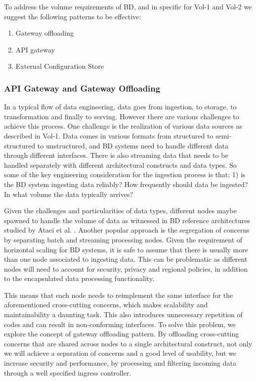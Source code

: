\documentclass{bmcart}
\begin{document}
To address the volume requirements of BD, and in specific for Vol-1 and Vol-2 we suggest the following patterns to be effective:

\begin{enumerate}
  \item Gateway offloading
  \item API gateway
  \item External Configuration Store
\end{enumerate}

\subsubsection{API Gateway and Gateway Offloading}

In a typical flow of data engineering, data goes from ingestion, to storage, to transformation and finally to serving. However there are various challenges to achieve this process. One challenge is the realization of various data sources as described in Vol-1. Data comes in various formats from structured to semi-structured to unstructured, and BD systems need to handle different data through different interfaces. There is also streaming data that needs to be handled separately with different architectural constructs and data types. So some of the key engineering consideration for the ingestion process is that; 1) is the BD system ingesting data reliably? How frequently should data be ingested? In what volume the data typically arrives?

Given the challenges and particularities of data types, different nodes maybe spawned to handle the volume of data as witnessed in BD reference architectures studied by Ataei et al. \cite{ataei2020big}. Another popular approach is the segregation of concerns by separating batch and streaming processing nodes. Given the requirement of horizontal scaling for BD systems, it is safe to assume that there is usually more than one node associated to ingesting data. This can be problematic as different nodes will need to account for security, privacy and regional policies, in addition to the encapsulated data processing functionality. 

This means that each node needs to reimplement the same interface for the aforementioned cross-cutting concerns, which makes scalability and maintainability a daunting task. This also introduces unnecessary repetition of codes and can result in non-conforming interfaces. To solve this problem, we explore the concept of gateway offloading pattern. By offloading cross-cutting concerns that are shared across nodes to a single architectural construct, not only we will achieve a separation of concerns and a good level of usability, but we increase security and performance, by processing and filtering incoming data through a well specified ingress controller.
\end{document}
